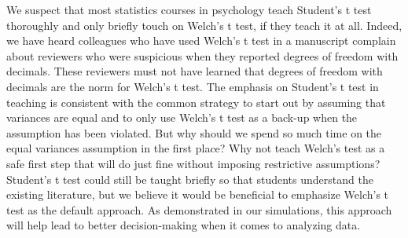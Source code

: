 \documentclass[man,a4paper,noextraspace,apacite]{apa6}
\begin{document}
    We suspect that most statistics courses in psychology teach Student's t test thoroughly and only briefly touch on Welch's t test, if they teach it at all. Indeed, we have heard colleagues who have used Welch's t test in a manuscript complain about reviewers who were suspicious when they reported degrees of freedom with decimals. These reviewers must not have learned that degrees of freedom with decimals are the norm for Welch's t test. The emphasis on Student's t test in teaching is consistent with the common strategy to start out by assuming that variances are equal and to only use Welch's t test as a back-up when the assumption has been violated. But why should we spend so much time on the equal variances assumption in the first place? Why not teach Welch's test as a safe first step that will do just fine without imposing restrictive assumptions? Student's t test could still be taught briefly so that students understand the existing literature, but we believe it would be beneficial to emphasize Welch's t test as the default approach. As demonstrated in our simulations, this approach will help lead to better decision-making when it comes to analyzing data. 








\end{document}

